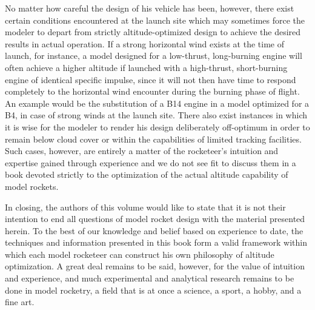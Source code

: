No matter how careful the design of his vehicle has been, however, there exist certain conditions
encountered at the launch site which may sometimes force the modeler to depart from strictly
altitude-optimized design to achieve the desired results in actual operation. If a strong
horizontal wind exists at the time of launch, for instance, a model designed for a low-thrust,
long-burning engine will often achieve a higher altitude if launched with a high-thrust,
short-burning engine of identical specific impulse, since it will not then have time to respond
completely to the horizontal wind encounter during the burning phase of flight. An example would be
the substitution of a B14 engine in a model optimized for a B4, in case of strong winds at the
launch site. There also exist instances in which it is wise for the modeler to render his design
deliberately off-optimum in order to remain below cloud cover or within the capabilities of limited
tracking facilities. Such cases, however, are entirely a matter of the rocketeer's intuition and
expertise gained through experience and we do not see fit to discuss them in a book devoted
strictly to the optimization of the actual altitude capability of model rockets.

In closing, the authors of this volume would like to state that it is not their intention to end
all questions of model rocket design with the material presented herein. To the best of our
knowledge and belief based on experience to date, the techniques and information presented in this
book form a valid framework within which each model rocketeer can construct his own philosophy of
altitude optimization. A great deal remains to be said, however, for the value of intuition and
experience, and much experimental and analytical research remains to be done in model rocketry, a
field that is at once a science, a sport, a hobby, and a fine art.
